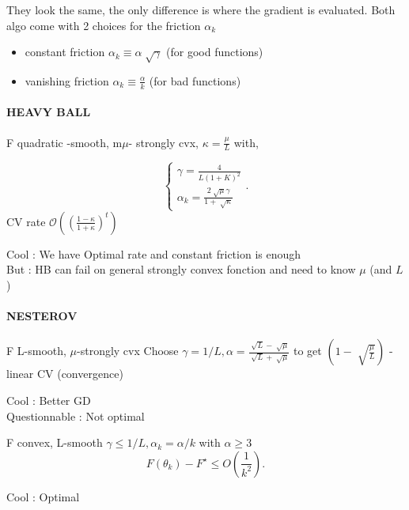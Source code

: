 \begin{note}
    They look the same, the only difference is where the gradient is evaluated. Both algo come with 2 choices for the friction $ \alpha _k $ \begin{itemize}
        \item constant friction $ \alpha _k \equiv \alpha \sqrt[]{\gamma } $ (for good functions)
        \item vanishing friction  $ \alpha _k \equiv \frac{\alpha}{k}  $ (for bad functions)
    \end{itemize}
\end{note}

\paragraph*{HEAVY BALL}
\begin{thm}
    F quadratic -smooth, m$\mu$- strongly cvx, $\kappa = \frac{\mu }{L}$ with,

    \[
        \begin{cases}
            \gamma = \frac{4}{L(1+K)^2} \\
             \alpha _k = \frac{2 \sqrt[]{\mu } \gamma }{1 + \sqrt[]{\kappa }}
        \end{cases} 
    .\]
    CV rate $\mathcal{O}((\frac{1 - \kappa }{1 + \kappa })^t )$

    Cool : We have Optimal rate and constant friction is enough \\
    But : HB can fail on general strongly convex fonction and need to know $ \mu  $  (and $ L $ )
\end{thm}

\paragraph*{NESTEROV}
\begin{thm}[]
    F L-smooth, $\mu$-strongly cvx
    Choose $ \gamma  = 1/L, \alpha = \frac{\sqrt[]{L} - \sqrt[]{\mu }}{ \sqrt[]{L} + \sqrt[]{\mu }} $ to get $ (1 - \sqrt[]{\frac{\mu }{L}}) $ -linear CV (convergence)

    Cool : Better GD \\
    Questionnable : Not optimal
\end{thm}

\begin{thm}
    F convex, L-smooth
    $ \gamma \leq 1/L, \alpha _k = \alpha / k $ with $ \alpha \geq 3 $ 
    \[
        F(\theta _k) - F^\star \leq O(\frac{1}{k^2})
    .\]
    
    Cool : Optimal
\end{thm}

